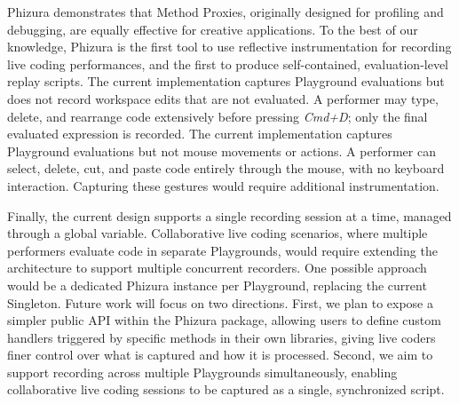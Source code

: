 \documentclass[
]{ceurart}
\begin{document}
Phizura demonstrates that Method Proxies, originally designed for profiling and debugging, are equally effective for creative applications. To the best of our knowledge, Phizura is the first tool to use reflective instrumentation for recording live coding performances, and the first to produce self-contained, evaluation-level replay scripts.
The current implementation captures Playground evaluations but does not record workspace edits that are not evaluated.
A performer may type, delete, and rearrange code extensively before pressing \textit{Cmd+D}; only the final evaluated expression is recorded.
The current implementation captures Playground evaluations but not mouse movements or actions. A performer can select, delete, cut, and paste code entirely through the mouse, with no keyboard interaction. Capturing these gestures would require additional instrumentation.


Finally, the current design supports a single recording session at a time, managed through a global variable. Collaborative live coding scenarios, where multiple performers evaluate code in separate Playgrounds, would require extending the architecture to support multiple concurrent recorders. One possible approach would be a dedicated Phizura instance per Playground, replacing the current Singleton.
Future work will focus on two directions. First, we plan to expose a simpler public API within the Phizura package, allowing users to define custom handlers triggered by specific methods in their own libraries, giving live coders finer control over what is captured and how it is processed. Second, we aim to support recording across multiple Playgrounds simultaneously, enabling collaborative live coding sessions to be captured as a single, synchronized script.




\appendix
\end{document}
